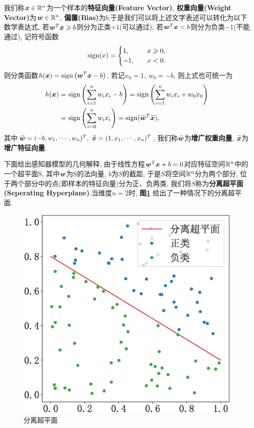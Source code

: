 \documentclass[12pt, a4paper, oneside]{ctexart}
\begin{document}
我们称$\boldsymbol{x}\in\mathbb{R}^n$为一个样本的\textbf{特征向量(Feature Vector)}, \textbf{权重向量(Weight Vector)}为$\boldsymbol{w}\in\mathbb{R}^n$, \textbf{偏置(Bias)}为$b$.于是我们可以将上述文字表述可以转化为以下数学表达式, 若$\boldsymbol{w}^T\boldsymbol{x} \geqslant b$则分为正类$+1$(可以通过), 若$\boldsymbol{w}^T\boldsymbol{x} < b$则分为负类$-1$(不能通过), 记符号函数
\begin{equation}
    \text{sign}(x) = \begin{cases}
        1, &\quad x\geqslant 0, \\
        -1,  &\quad x < 0.
    \end{cases}
\end{equation}
则分类函数$\displaystyle h(\boldsymbol{x}) = \text{sign}\left(\boldsymbol{w}^T\boldsymbol{x} - b\right)$, 若记$x_0 = 1, \ w_0 = -b$, 则上式也可统一为
\begin{equation}\label{eq-分类函数}
\begin{aligned}
    h(\boldsymbol{x}) =&\ \text{sign}\left(\sum_{i=1}^nw_ix_i-b\right) = \text{sign}\left(\sum_{i=1}^nw_ix_i+w_0x_0\right)\\
    =&\ \text{sign}\left(\sum_{i=0}^nw_ix_i\right) = \text{sign}(\widetilde{\boldsymbol{w}}^T\widetilde{\boldsymbol{x}}),
\end{aligned}
\end{equation}
其中$\widetilde{\boldsymbol{w}} = (-b, w_1, \cdots, w_n)^T, \ \widetilde{\boldsymbol{x}} = (1, x_1, \cdots, x_n)^T$, 我们称$\widetilde{\boldsymbol{w}}$为\textbf{增广权重向量}, $\widetilde{\boldsymbol{x}}$为\textbf{增广特征向量}.

下面给出感知器模型的几何解释, 由于线性方程$\boldsymbol{w}^T\boldsymbol{x}+b = 0$对应特征空间$\mathbb{R}^n$中的一个超平面$\text{S}$, 其中$\boldsymbol{w}$为$\text{S}$的法向量, $b$为$S$的截距, 于是$S$将空间$\mathbb{R}^n$分为两个部分, 位于两个部分中的点(即样本的特征向量)分为正、负两类, 我们将$S$称为\textbf{分离超平面(Seperating Hyperplane)}.当维度$n=2$时, \textbf{图\ref{figure-分离超平面}} 给出了一种情况下的分离超平面.

\begin{figure}[h]
    \centering
    \setlength{\abovecaptionskip}{0.cm}
    \includegraphics[scale=0.5]{分离平面.eps}
    \caption{分离超平面}
    \label{figure-分离超平面}
\end{figure}
\end{document}
